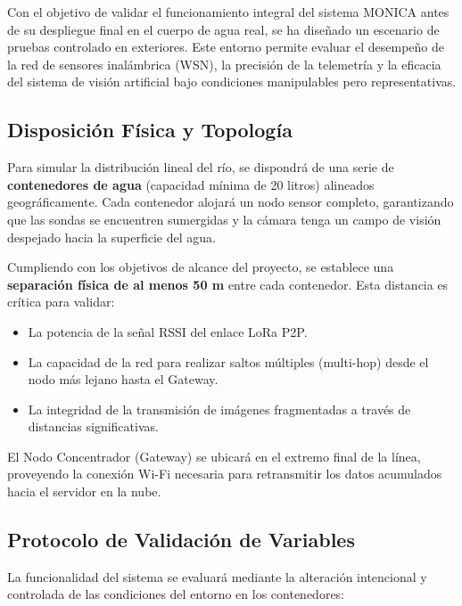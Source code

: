 Con el objetivo de validar el funcionamiento integral del sistema MONICA antes de su despliegue final en el cuerpo de agua real, se ha diseñado un escenario de pruebas controlado en exteriores. Este entorno permite evaluar el desempeño de la red de sensores inalámbrica (WSN), la precisión de la telemetría y la eficacia del sistema de visión artificial bajo condiciones manipulables pero representativas.


\subsection{Disposición Física y Topología}
\label{subsec:disposicion_fisica_y_topologia}
Para simular la distribución lineal del río, se dispondrá de una serie de \textbf{contenedores de agua} (capacidad mínima de 20 litros) alineados geográficamente. Cada contenedor alojará un nodo sensor completo, garantizando que las sondas se encuentren sumergidas y la cámara tenga un campo de visión despejado hacia la superficie del agua.

Cumpliendo con los objetivos de alcance del proyecto, se establece una \textbf{separación física de al menos 50 m} entre cada contenedor. Esta distancia es crítica para validar:
\begin{itemize}
  \item La potencia de la señal RSSI del enlace LoRa P2P.
  \item La capacidad de la red para realizar saltos múltiples (multi-hop) desde el nodo más lejano hasta el Gateway.
  \item La integridad de la transmisión de imágenes fragmentadas a través de distancias significativas.
\end{itemize}

El Nodo Concentrador (Gateway) se ubicará en el extremo final de la línea, proveyendo la conexión Wi-Fi necesaria para retransmitir los datos acumulados hacia el servidor en la nube.


\subsection{Protocolo de Validación de Variables}
\label{subsec:protocolo_de_validacion_de_variables}
La funcionalidad del sistema se evaluará mediante la alteración intencional y controlada de las condiciones del entorno en los contenedores:

